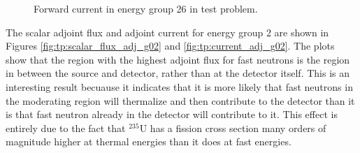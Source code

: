 \begin{figure}
\begin{minipage}{0.49\linewidth}
    \caption{Forward current in energy group 26 in test problem.}
    \label{fig:tp:current_fwd_g26}
  \end{minipage}
\end{figure}


The scalar adjoint flux and adjoint current for energy group 2 are shown in Figures \ref{fig:tp:scalar_flux_adj_g02} and \ref{fig:tp:current_adj_g02}.
The plots show that the region with the highest adjoint flux for fast neutrons is the region in between the source and detector, rather than at the detector itself.
This is an interesting result becuause it indicates that it is more likely that fast neutrons in the moderating region will thermalize and then contribute to the detector than it is that fast neutron already in the detector will contribute to it.
This effect is entirely due to the fact that ${}^{235}\text{U}$ has a fission cross section many orders of magnitude higher at thermal energies than it does at fast energies.

